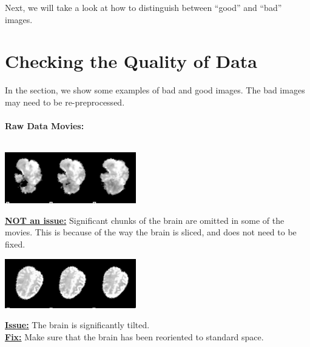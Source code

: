 \documentclass[12pt]{article}
\begin{document}
Next, we will take a look at how to distinguish between ``good'' and ``bad'' images. 

\section{Checking the Quality of Data}

In the section, we show some examples of bad and good images. The bad images may need to be re-preprocessed. 
\\
\\
\large{\textbf{Raw Data Movies:}}
\\\\
\noindent\begin{minipage}{0.45\textwidth}
	\includegraphics[scale=0.85]{bad_image2.png}
\end{minipage}%
\hfill%
\begin{minipage}{0.45\textwidth}
	\underline{\textbf{NOT an issue:}} Significant chunks of the brain are omitted in some of the movies. This is because of the way the brain is sliced, and does not need to be fixed.
	\\
\end{minipage}\newline\newline

\noindent\begin{minipage}{0.45\textwidth}
	\includegraphics[scale=0.9]{bad_image3.png}
\end{minipage}%
\hfill%
\begin{minipage}{0.45\textwidth}
	\underline{\textbf{Issue:}} The brain is significantly tilted. \\
	\underline{\textbf{Fix:}} Make sure that the brain has been reoriented to standard space. 
\end{minipage}\newline\newline
\end{document}
